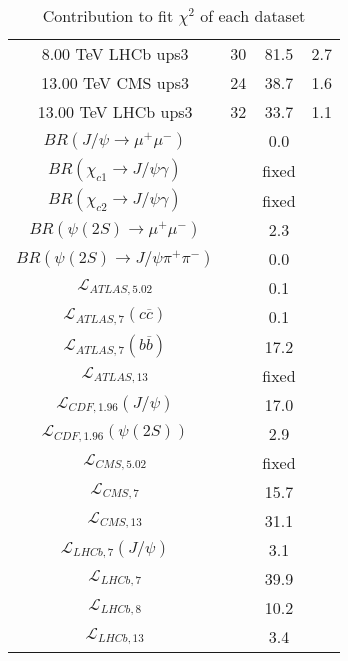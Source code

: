 \begin{table}[h!]
\begin{tabular}{c|c|c|c}
8.00 TeV LHCb ups3 & 30 & 81.5 & 2.7 \\
13.00 TeV CMS ups3 & 24 & 38.7 & 1.6 \\
13.00 TeV LHCb ups3 & 32 & 33.7 & 1.1 \\
\hline
$BR(J/\psi\rightarrow\mu^+\mu^-)$ &  & 0.0 &  \\
$BR(\chi_{c1}\rightarrow J/\psi\gamma)$ &  & fixed & \\
$BR(\chi_{c2}\rightarrow J/\psi\gamma)$ &  & fixed & \\
$BR(\psi(2S)\rightarrow\mu^+\mu^-)$ &  & 2.3 &  \\
$BR(\psi(2S)\rightarrow J/\psi\pi^+\pi^-)$ &  & 0.0 &  \\
$\mathcal L_{ATLAS,5.02}$ &  & 0.1 &  \\
$\mathcal L_{ATLAS,7}(c\overline c)$ &  & 0.1 &  \\
$\mathcal L_{ATLAS,7}(b\overline b)$ &  & 17.2 &  \\
$\mathcal L_{ATLAS,13}$ &  & fixed & \\
$\mathcal L_{CDF,1.96}(J/\psi)$ &  & 17.0 &  \\
$\mathcal L_{CDF,1.96}(\psi(2S))$ &  & 2.9 &  \\
$\mathcal L_{CMS,5.02}$ &  & fixed & \\
$\mathcal L_{CMS,7}$ &  & 15.7 &  \\
$\mathcal L_{CMS,13}$ &  & 31.1 &  \\
$\mathcal L_{LHCb,7}(J/\psi)$ &  & 3.1 &  \\
$\mathcal L_{LHCb,7}$ &  & 39.9 &  \\
$\mathcal L_{LHCb,8}$ &  & 10.2 &  \\
$\mathcal L_{LHCb,13}$ &  & 3.4 &  \\
\end{tabular}
\caption{Contribution to fit $\chi^2$ of each dataset}
\end{table}
